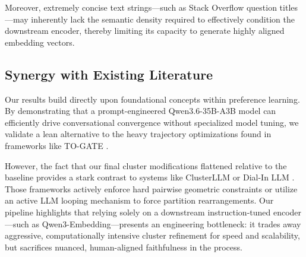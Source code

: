 Moreover, extremely concise text strings—such as Stack Overflow question titles—may inherently lack the semantic density required to effectively condition the downstream encoder, thereby limiting its capacity to generate highly aligned embedding vectors.

\subsection{Synergy with Existing Literature}
Our results build directly upon foundational concepts within preference learning. 
By demonstrating that a prompt-engineered Qwen3.6-35B-A3B model can efficiently drive conversational convergence without specialized model tuning, we validate a lean alternative to the heavy trajectory optimizations found in frameworks like TO-GATE \cite{to_gate}. 

However, the fact that our final cluster modifications flattened relative to the baseline provides a stark contrast to systems like ClusterLLM \cite{clusterllm} or Dial-In LLM \cite{dial_in_llm}. 
Those frameworks actively enforce hard pairwise geometric constraints or utilize an active LLM looping mechanism to force partition rearrangements. 
Our pipeline highlights that relying solely on a downstream instruction-tuned encoder—such as Qwen3-Embedding—presents an engineering bottleneck: 
it trades away aggressive, computationally intensive cluster refinement for speed and scalability, but sacrifices nuanced, human-aligned faithfulness in the process.